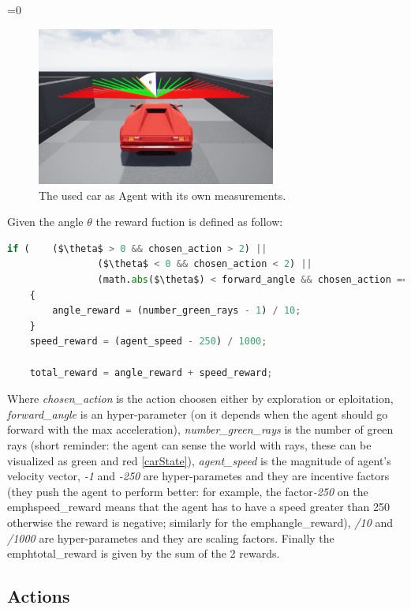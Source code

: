 \documentclass[14pt]{extarticle}
\def\sp{\vspace{5pt}}
\newcounter{debug}
\begin{document}
\begin{flushleft}
\ifnum\value{debug}=0 {
\begin{figure}[H] \label{carAngle}
    		\centering\includegraphics[width=0.7\textwidth]{./Image/RF/carAngle.png}
		\vspace{5mm}
    		\caption{The used car as Agent with its own measurements.}
	\end{figure}
} \fi
	Given the angle $\theta$ the reward fuction is defined as follow:
\begin{lstlisting}[mathescape=true, language=Python]
	if (	($\theta$ > 0 && chosen_action > 2) ||
				($\theta$ < 0 && chosen_action < 2) ||
				(math.abs($\theta$) < forward_angle && chosen_action == 2))
	{
		angle_reward = (number_green_rays - 1) / 10;
	}
	speed_reward = (agent_speed - 250) / 1000;
	
	total_reward = angle_reward + speed_reward;
\end{lstlisting}
	Where \emph{chosen\_action} is the action choosen either by exploration or eploitation, \emph{forward\_angle} is an hyper-parameter (on it depends when the agent should go forward with the max acceleration), \emph{number\_green\_rays} is the number of green rays (short reminder: the agent can sense the world with rays, these can be visualized as green and red \ref{carState}), \emph{agent\_speed} is the magnitude of agent's velocity vector, \emph{-1} and \emph{-250} are hyper-parametes and they are incentive factors (they push the agent to perform better: for example, the factor\emph{-250} on the emph{speed\_reward} means that the agent has to have a speed greater than 250 otherwise the reward is negative; similarly for the emph{angle\_reward}), \emph{/10} and \emph{/1000} are hyper-parametes and they are scaling factors. Finally the emph{total\_reward} is given by the sum of the 2 rewards.
	\subsection{Actions}
	\sp

\end{flushleft}
\end{document}
